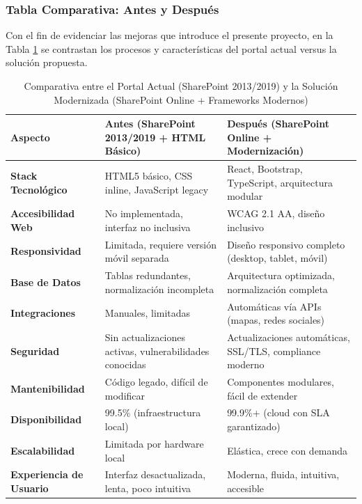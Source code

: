 \subsubsection{Tabla Comparativa: Antes y Después}
\label{subsec:tabla_comparativa}

Con el fin de evidenciar las mejoras que introduce el presente proyecto, en la Tabla \ref{tab:comparativa_uat} se contrastan los procesos y características del portal actual versus la solución propuesta.

\begin{table}[H]
\centering
\caption{Comparativa entre el Portal Actual (SharePoint 2013/2019) y la Solución Modernizada (SharePoint Online + Frameworks Modernos)}
\label{tab:comparativa_uat}
\renewcommand{\arraystretch}{1.3}
\begin{tabular}{|p{3cm}|p{5cm}|p{5cm}|}
\hline
\textbf{Aspecto} & \textbf{Antes (SharePoint 2013/2019 + HTML Básico)} & \textbf{Después (SharePoint Online + Modernización)} \\
\hline
\textbf{Stack Tecnológico} & HTML5 básico, CSS inline, JavaScript legacy & React, Bootstrap, TypeScript, arquitectura modular \\
\hline
\textbf{Accesibilidad Web} & No implementada, interfaz no inclusiva & WCAG 2.1 AA, diseño inclusivo \\
\hline
\textbf{Responsividad} & Limitada, requiere versión móvil separada & Diseño responsivo completo (desktop, tablet, móvil) \\
\hline
\textbf{Base de Datos} & Tablas redundantes, normalización incompleta & Arquitectura optimizada, normalización completa \\
\hline
\textbf{Integraciones} & Manuales, limitadas & Automáticas vía APIs (mapas, redes sociales) \\
\hline
\textbf{Seguridad} & Sin actualizaciones activas, vulnerabilidades conocidas & Actualizaciones automáticas, SSL/TLS, compliance moderno \\
\hline
\textbf{Mantenibilidad} & Código legado, difícil de modificar & Componentes modulares, fácil de extender \\
\hline
\textbf{Disponibilidad} & 99.5\% (infraestructura local) & 99.9\%+ (cloud con SLA garantizado) \\
\hline
\textbf{Escalabilidad} & Limitada por hardware local & Elástica, crece con demanda \\
\hline
\textbf{Experiencia de Usuario} & Interfaz desactualizada, lenta, poco intuitiva & Moderna, fluida, intuitiva, accesible \\
\hline
\end{tabular}
\end{table}

